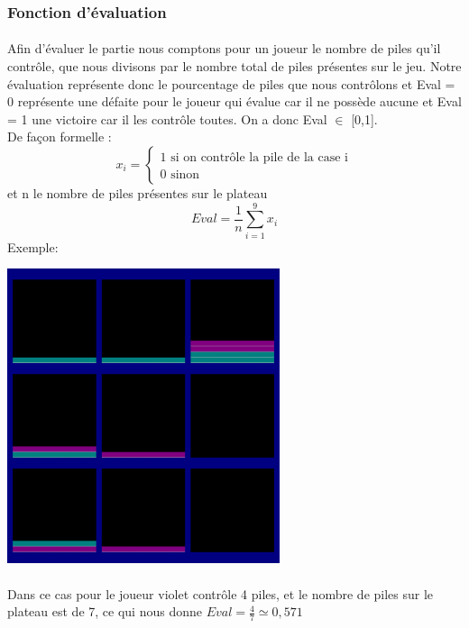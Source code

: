 \documentclass[article, backcover, french, nodocumentinfo]{upmethodology-document}
\begin{document}
			\subsubsection{Fonction d'évaluation}
				\paragraph{}
					Afin d'évaluer le partie
					nous comptons pour un joueur  le nombre de piles qu’il contrôle, que nous divisons par le nombre total de piles présentes sur le jeu.
					Notre évaluation représente donc le pourcentage de piles que nous contrôlons et Eval = 0 représente une défaite pour le joueur qui évalue car il ne possède aucune  et Eval = 1 une victoire car il les contrôle toutes. On a donc Eval $\in$ [0,1].\\
					De façon formelle :
					\[
					x_{i} = \left\{
					\begin{array}{ll}
						1 \mbox{ si  on contrôle la pile de la case i} \\
						0  \mbox{ sinon}
					\end{array}
					\right.
					\]
					et n le nombre de piles présentes sur le plateau
					\[Eval = \frac{1}{n}  \sum_{i = 1}^{9} x_{i}\]
					Exemple:
					\begin{center}
						\includegraphics[width=0.6\textwidth]{figures/Eval.png}
					\end{center}
				\paragraph{}
					Dans ce cas pour le joueur violet contrôle 4 piles, et le nombre de piles sur le plateau est de 7, ce qui nous donne $Eval = \frac{4}{7} \simeq 0,571$
\end{document}
